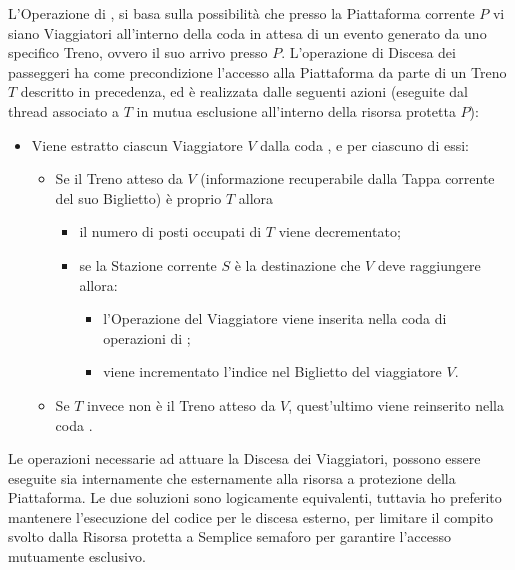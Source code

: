 \begin{description}
		L'Operazione di , si basa sulla possibilità che presso la Piattaforma corrente $P$ vi siano Viaggiatori all'interno della coda  in attesa di un evento generato da uno specifico Treno, ovvero il suo arrivo presso $P$. L'operazione di Discesa dei passeggeri ha come precondizione l'accesso alla Piattaforma da parte di un Treno $T$ descritto in precedenza, ed è realizzata dalle seguenti azioni (eseguite dal thread associato a $T$ in mutua esclusione all'interno della risorsa protetta $P$):
		\begin{itemize}
			\item Viene estratto ciascun Viaggiatore $V$ dalla coda , e per ciascuno di essi:
			\begin{itemize}
				\item Se il Treno atteso da $V$ (informazione recuperabile dalla Tappa corrente del suo Biglietto) è proprio $T$ allora
					\begin{itemize}
						\item il numero di posti occupati di $T$ viene decrementato;
						\item se la Stazione corrente $S$  è la destinazione che $V$ deve raggiungere allora:
							\begin{itemize}
								\item l'Operazione  del Viaggiatore viene inserita nella coda di operazioni di ;
								\item viene incrementato l'indice  nel Biglietto del viaggiatore $V$.
							\end{itemize}
					\end{itemize}
				\item Se $T$ invece non è il Treno atteso da $V$, quest'ultimo viene reinserito nella coda .
			\end {itemize}
		\end{itemize}
		
	Le operazioni necessarie ad attuare la Discesa dei Viaggiatori, possono essere eseguite sia internamente che esternamente alla risorsa a protezione della Piattaforma. Le due soluzioni sono logicamente equivalenti, tuttavia ho preferito mantenere l'esecuzione del codice per le discesa esterno, per limitare il compito svolto dalla Risorsa protetta a Semplice semaforo per garantire l'accesso mutuamente esclusivo.
	
	\item{}\\
		

\end{description}
